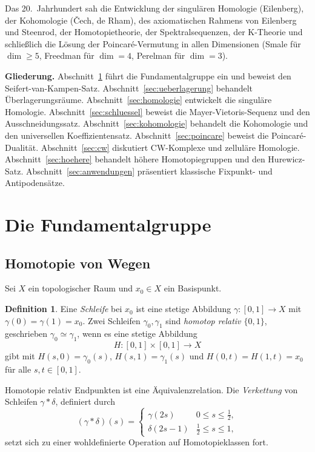 \documentclass[12pt,a4paper]{amsart}
\theoremstyle{definition}
\newtheorem{definition}[theorem]{Definition}
\begin{document}
Das 20.~Jahrhundert sah die Entwicklung der singul\"aren Homologie (Eilenberg),
der Kohomologie (\v{C}ech, de Rham), des axiomatischen Rahmens von Eilenberg und
Steenrod, der Homotopietheorie, der Spektralsequenzen, der K-Theorie und schlie\ss{}lich
die L\"osung der Poincar\'e-Vermutung in allen Dimensionen (Smale f\"ur $\dim \geq 5$,
Freedman f\"ur $\dim = 4$, Perelman f\"ur $\dim = 3$).

\medskip\noindent\textbf{Gliederung.}
Abschnitt~\ref{sec:fundamentalgruppe} f\"uhrt die Fundamentalgruppe ein und beweist
den Seifert-van-Kampen-Satz. Abschnitt~\ref{sec:ueberlagerung} behandelt
\"Uberlagerungsr\"aume. Abschnitt~\ref{sec:homologie} entwickelt die singul\"are
Homologie. Abschnitt~\ref{sec:schluessel} beweist die Mayer-Vietoris-Sequenz und
den Ausschneidungssatz. Abschnitt~\ref{sec:kohomologie} behandelt die Kohomologie
und den universellen Koeffizientensatz. Abschnitt~\ref{sec:poincare} beweist die
Poincar\'e-Dualit\"at. Abschnitt~\ref{sec:cw} diskutiert CW-Komplexe und
zelluläre Homologie. Abschnitt~\ref{sec:hoehere} behandelt h\"ohere Homotopiegruppen
und den Hurewicz-Satz. Abschnitt~\ref{sec:anwendungen} pr\"asentiert klassische
Fixpunkt- und Antipodensätze.

\section{Die Fundamentalgruppe}
\label{sec:fundamentalgruppe}

\subsection{Homotopie von Wegen}

Sei $X$ ein topologischer Raum und $x_0 \in X$ ein Basispunkt.

\begin{definition}
Eine \emph{Schleife} bei $x_0$ ist eine stetige Abbildung
$\gamma\colon [0,1] \to X$ mit $\gamma(0) = \gamma(1) = x_0$.
Zwei Schleifen $\gamma_0, \gamma_1$ sind \emph{homotop relativ $\{0,1\}$},
geschrieben $\gamma_0 \simeq \gamma_1$, wenn es eine stetige Abbildung
\[
  H\colon [0,1] \times [0,1] \to X
\]
gibt mit $H(s,0) = \gamma_0(s)$, $H(s,1) = \gamma_1(s)$ und
$H(0,t) = H(1,t) = x_0$ f\"ur alle $s, t \in [0,1]$.
\end{definition}

Homotopie relativ Endpunkten ist eine \"Aquivalenzrelation. Die
\emph{Verkettung} von Schleifen $\gamma * \delta$, definiert durch
\[
  (\gamma * \delta)(s) = \begin{cases}
    \gamma(2s) & 0 \leq s \leq \tfrac{1}{2}, \\
    \delta(2s-1) & \tfrac{1}{2} \leq s \leq 1,
  \end{cases}
\]
setzt sich zu einer wohldefinierte Operation auf Homotopieklassen fort.
\end{document}
